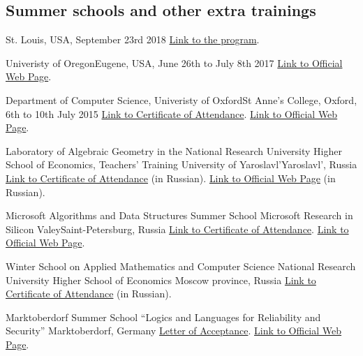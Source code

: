 \documentclass[11pt,a4paper]{moderncv}   %
\newcommand{\myhref}[2]{\textcolor{blue}{\href{#1}{#2}}}
\begin{document}
\subsection{Summer schools and other extra trainings}
%
    {}{St. Louis, USA, September 23rd 2018}%
    {}%
    {\myhref{https://icfp18.sigplan.org/track/PLMW-ICFP-2018}{Link to the program}.}

%
    {Univeristy of Oregon}{Eugene, USA, June 26th to July 8th 2017}%
    {}%
    {\myhref{https://www.cs.uoregon.edu/research/summerschool/summer17/}{Link to Official Web Page}.}

%
    {Department of Computer Science, Univeristy of Oxford}{St Anne's College, Oxford, 6th to 10th July 2015}%
    {}%
    {\myhref{http://staff.mmcs.sfedu.ru/~ulysses/Papers/Trainings/2015-oxford.pdf}{Link to Certificate of Attendance}. \myhref{https://www.cs.ox.ac.uk/projects/utgp/school/}{Link to Official Web Page}.}

%
    {Laboratory of Algebraic Geometry in the National Research University Higher School of Economics, Teachers' Training University of Yaroslavl'}{Yaroslavl', Russia}%
    {}%
    {\myhref{http://mmcs.sfedu.ru/~ulysses/Papers/Trainings/2011-Yaroslavl.jpg}{Link to Certificate of Attendance} (in Russian). \myhref{http://bogomolov-lab.ru/SHKOLA/}{Link to Official Web Page} (in Russian).}

%
    {Microsoft Algorithms and Data Structures Summer School}%
    {Microsoft Research in Silicon Valey}{Saint-Petersburg, Russia}{}%
    {\myhref{http://mmcs.sfedu.ru/~ulysses/Papers/Trainings/2010-MIDAS-participation.jpg}{Link to Certificate of Attendance}. \myhref{http://logic.pdmi.ras.ru/midas/en/about}{Link to Official Web Page}.}

%
    {Winter School on Applied Mathematics and Computer Science}%
    {National Research University Higher School of Economics}%
    {Moscow province, Russia}{}%
    {\myhref{http://mmcs.sfedu.ru/~ulysses/Papers/Trainings/2010-HSE-math-school-participation.jpg}{Link to Certificate of Attendance} (in Russian).}

%
    {Marktoberdorf Summer School “Logics and Languages for Reliability and Security”}%
    {}{Marktoberdorf, Germany}{}%
    {\myhref{http://mmcs.sfedu.ru/~ulysses/Papers/Trainings/2009-Marktoberdorf-adoption.jpg}{Letter of Acceptance}. \myhref{http://asimod.in.tum.de/2009/index.shtml}{Link to Official Web Page}.}
\end{document}
